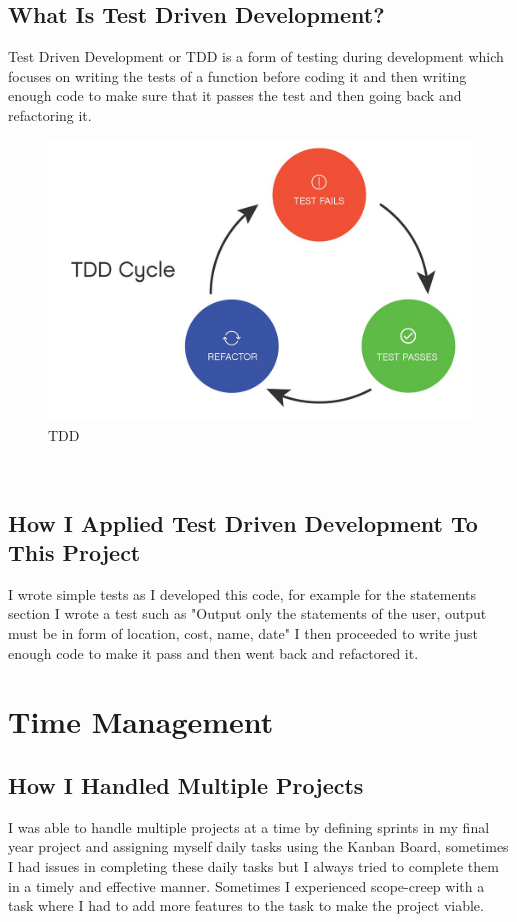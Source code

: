 \subsection{What Is Test Driven Development?}
Test Driven Development or TDD is a form of testing during development which focuses on writing the tests of a function before coding it and then writing enough code to make sure that it passes the test and then going back and refactoring it\cite{TDD}.
\begin{figure}[h!]
  \includegraphics[width=\textwidth]{img/tdd.jpg}
  \caption{TDD}
  \label{fig: Image of Test Driven Development}
\end{figure}
\\
\cite{TDDImage}
\subsection{How I Applied Test Driven Development To This Project}
I wrote simple tests as I developed this code, for example for the statements section I wrote a test such as "Output only the statements of the user, output must be in form of location, cost, name, date" I then proceeded to write just enough code to make it pass and then went back and refactored it.
\section{Time Management}
\subsection{How I Handled Multiple Projects}
I was able to handle multiple projects at a time by defining sprints in my final year project and assigning myself daily tasks using the Kanban Board, sometimes I had issues in completing these daily tasks but I always tried to complete them in a timely and effective manner.  Sometimes I experienced scope-creep with a task where I had to add more features to the task to make the project viable.
